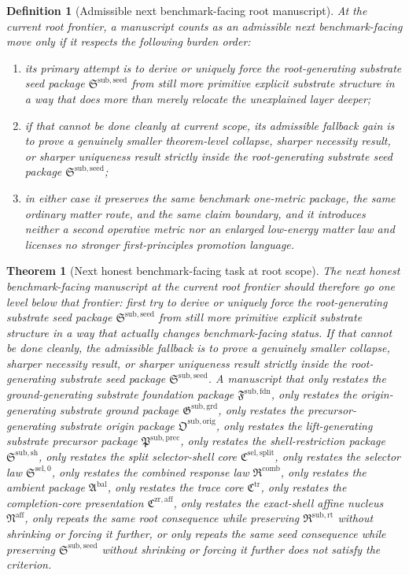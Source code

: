 \documentclass[11pt]{article}
\newcommand{\FoundationPackage}{\mathfrak F^{\mathrm{sub,fdn}}}
\newcommand{\GroundPackage}{\mathfrak G^{\mathrm{sub,grd}}}
\newcommand{\OriginPackage}{\mathfrak O^{\mathrm{sub,orig}}}
\newcommand{\PrecursorPackage}{\mathfrak P^{\mathrm{sub,prec}}}
\newcommand{\ShellRestriction}{\mathfrak S^{\mathrm{sub,sh}}}
\newcommand{\SelectorCore}{\mathfrak C^{\mathrm{sel,split}}}
\newcommand{\SelectorLaw}{\mathfrak S^{\mathrm{sel},0}}
\newcommand{\CombinedLaw}{\mathfrak R^{\mathrm{comb}}}
\newcommand{\AmbientPackage}{\mathfrak A^{\mathrm{bal}}}
\newcommand{\TraceCore}{\mathfrak C^{\mathrm{tr}}}
\newcommand{\CompletionCore}{\mathfrak C^{\mathrm{zr,aff}}}
\newcommand{\AffineNucleus}{\mathfrak N^{\mathrm{aff}}}
\newcommand{\RootPackage}{\mathfrak R^{\mathrm{sub,rt}}}
\newcommand{\SeedPackage}{\mathfrak S^{\mathrm{sub,seed}}}
\newtheorem{definition}{Definition}
\newtheorem{theorem}{Theorem}
\begin{document}
\begin{definition}[Admissible next benchmark-facing root manuscript]
At the current root frontier, a manuscript counts as an admissible next benchmark-facing move only if it respects the following burden order:
\begin{enumerate}
    \item its primary attempt is to derive or uniquely force the root-generating substrate seed package \(\SeedPackage\) from still more primitive explicit substrate structure in a way that does more than merely relocate the unexplained layer deeper;
    \item if that cannot be done cleanly at current scope, its admissible fallback gain is to prove a genuinely smaller theorem-level collapse, sharper necessity result, or sharper uniqueness result strictly inside the root-generating substrate seed package \(\SeedPackage\);
    \item in either case it preserves the same benchmark one-metric package, the same ordinary matter route, and the same claim boundary, and it introduces neither a second operative metric nor an enlarged low-energy matter law and licenses no stronger first-principles promotion language.
\end{enumerate}
\end{definition}

\begin{theorem}[Next honest benchmark-facing task at root scope]
The next honest benchmark-facing manuscript at the current root frontier should therefore go one level below that frontier: first try to derive or uniquely force the root-generating substrate seed package \(\SeedPackage\) from still more primitive explicit substrate structure in a way that actually changes benchmark-facing status. If that cannot be done cleanly, the admissible fallback is to prove a genuinely smaller collapse, sharper necessity result, or sharper uniqueness result strictly inside the root-generating substrate seed package \(\SeedPackage\). A manuscript that only restates the ground-generating substrate foundation package \(\FoundationPackage\), only restates the origin-generating substrate ground package \(\GroundPackage\), only restates the precursor-generating substrate origin package \(\OriginPackage\), only restates the lift-generating substrate precursor package \(\PrecursorPackage\), only restates the shell-restriction package \(\ShellRestriction\), only restates the split selector-shell core \(\SelectorCore\), only restates the selector law \(\SelectorLaw\), only restates the combined response law \(\CombinedLaw\), only restates the ambient package \(\AmbientPackage\), only restates the trace core \(\TraceCore\), only restates the completion-core presentation \(\CompletionCore\), only restates the exact-shell affine nucleus \(\AffineNucleus\), only repeats the same root consequence while preserving \(\RootPackage\) without shrinking or forcing it further, or only repeats the same seed consequence while preserving \(\SeedPackage\) without shrinking or forcing it further does not satisfy the criterion.
\end{theorem}
\end{document}
